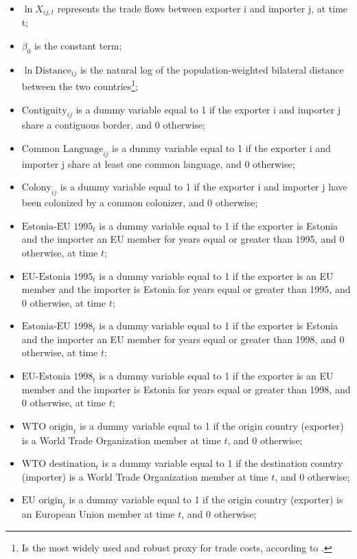 \documentclass[a4paper,10pt]{article}
\begin{document}
\begin{spacing}{1}
	\begin{itemize}
		\item $\ln X_{ij,t}$ represents the trade flows between exporter i and importer j, at time t;
		\item $\beta_0$ is the constant term;
		\item $\ln \text{Distance}_{ij}$ is the natural log of the population-weighted bilateral distance between the two countries\footnote{Is the most widely used and robust proxy for trade costs, according to \cite{disdier_puzzling_2008}.};
		\item $\text{Contiguity}_{ij}$ is a dummy variable equal to 1 if the exporter i and importer j share a contiguous border, and 0 otherwise;
		\item $\text{Common Language}_{ij}$ is a dummy variable equal to 1 if the exporter i and importer j share at least one common language, and 0 otherwise;
		\item $\text{Colony}_{ij}$ is a dummy variable equal to 1 if the exporter i and importer j have been colonized by a common colonizer, and 0 otherwise;
		\item $\text{Estonia-EU 1995}_{t}$ is a dummy variable equal to 1 if the exporter is Estonia and the importer an EU member for years equal or greater than 1995, and 0 otherwise, at time $t$;
		\item $\text{EU-Estonia 1995}_{t}$ is a dummy variable equal to 1 if the exporter is an EU member and the importer is Estonia for years equal or greater than 1995, and 0 otherwise, at time $t$;
		\item $\text{Estonia-EU 1998}_{t}$ is a dummy variable equal to 1 if the exporter is Estonia and the importer an EU member for years equal or greater than 1998, and 0 otherwise, at time $t$;
		\item $\text{EU-Estonia 1998}_{t}$ is a dummy variable equal to 1 if the exporter is an EU member and the importer is Estonia for years equal or greater than 1998, and 0 otherwise, at time $t$;
		\item $\text{WTO origin}_{t}$ is a dummy variable equal to 1 if the origin country (exporter) is a World Trade
		Organization member at time $t$, and 0 otherwise;
		\item $\text{WTO destination}_{t}$ is a dummy variable equal to 1 if the destination country (importer) is a World Trade	Organization member at time $t$, and 0 otherwise;
		\item $\text{EU origin}_{t}$ is a dummy variable equal to 1 if the origin country (exporter) is an European Union member at time $t$, and 0 otherwise;

\end{itemize}
\end{spacing}
\end{document}
